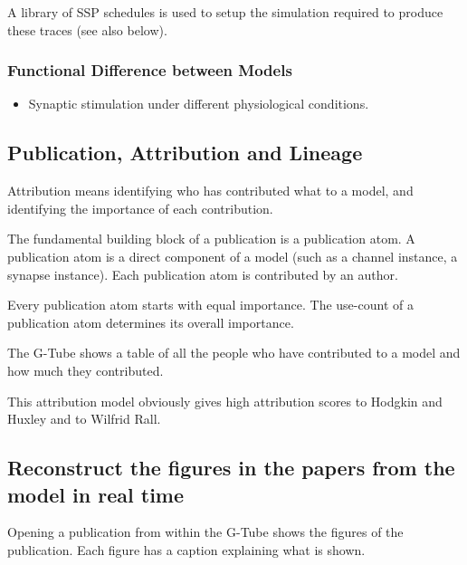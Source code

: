 \documentclass[12pt]{article}
\begin{document}
A library of SSP schedules is used to setup the simulation required to
produce these traces (see also below).


\subsubsection{Functional Difference between Models}

\begin{itemize}
\item Synaptic stimulation under different physiological conditions.
\end{itemize}


\subsection{Publication, Attribution and Lineage}

Attribution means identifying who has contributed what to a model, and
identifying the importance of each contribution.

The fundamental building block of a publication is a publication atom.
A publication atom is a direct component of a model (such as a channel
instance, a synapse instance).  Each publication atom is contributed
by an author.

Every publication atom starts with equal importance.  The use-count of
a publication atom determines its overall importance.

The G-Tube shows a table of all the people who have contributed to a
model and how much they contributed.

This attribution model obviously gives high attribution scores to
Hodgkin and Huxley and to Wilfrid Rall.




\subsection{Reconstruct the figures in the papers from the model in real time}

Opening a publication from within the G-Tube shows the figures of the
publication.  Each figure has a caption explaining what is shown.
\end{document}
